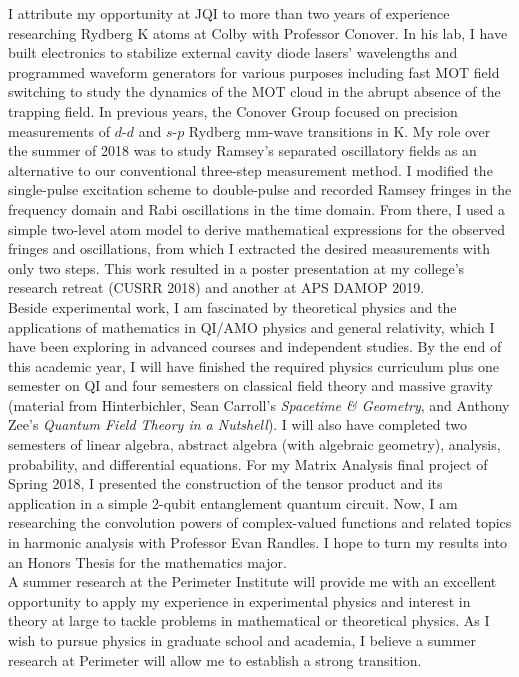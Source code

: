 \documentclass[10pt]{article}
\begin{document}
I attribute my opportunity at JQI to more than two years of experience researching Rydberg K atoms at Colby with Professor  Conover. In his lab, I have built electronics to stabilize external cavity diode lasers' wavelengths and programmed waveform generators for various purposes including fast MOT field switching to study the dynamics of the MOT cloud in the abrupt absence of the trapping field. In previous years, the Conover Group focused on precision measurements of $d$-$d$ and $s$-$p$ Rydberg mm-wave transitions in K. My role over the summer of 2018 was to study Ramsey's separated oscillatory fields as an alternative to our conventional three-step measurement method. I modified the single-pulse excitation scheme to double-pulse and recorded Ramsey fringes in the frequency domain and Rabi oscillations in the time domain. From there, I used a simple two-level atom model to derive mathematical expressions for the observed fringes and oscillations, from which I extracted the desired measurements with only two steps. This work resulted in a poster presentation at my college's research retreat (CUSRR 2018) and another at APS DAMOP 2019.  \\


Beside experimental work, I am fascinated by theoretical physics and the applications of mathematics in QI/AMO physics and general relativity, which I have been exploring in advanced courses and independent studies. By the end of this academic year, I will have finished the required physics curriculum plus one semester on QI and four semesters on classical field theory and massive gravity (material from Hinterbichler\cite{RevModPhys.84.671}, Sean Carroll's \textit{Spacetime \& Geometry}, and Anthony Zee's \textit{Quantum Field Theory in a Nutshell}). I will also have completed two semesters of linear algebra, abstract algebra (with algebraic geometry), analysis, probability, and differential equations. For my Matrix Analysis final project of Spring 2018, I presented the construction of the tensor product and its application in a simple 2-qubit entanglement quantum circuit. Now, I am researching the convolution powers of complex-valued functions and related topics in harmonic analysis with Professor Evan Randles. I hope to turn my results into an Honors Thesis for the mathematics major. \\

  
A summer research at the Perimeter Institute will provide me with an excellent opportunity to apply my experience in experimental physics and interest in theory at large to tackle problems in mathematical or theoretical physics. As I wish to pursue physics in graduate school and academia, I believe a summer research at Perimeter will allow me to establish a strong transition.



 

















	
	
	
	
	
\end{document}
